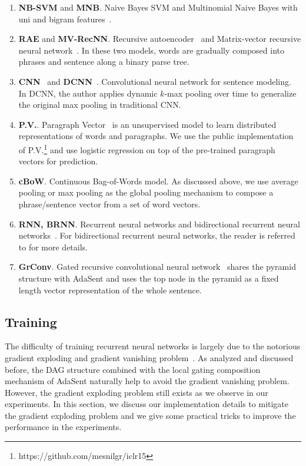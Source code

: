 \documentclass{article}
\theoremstyle{definition}
\begin{document}
\begin{enumerate}
	\item 	\textbf{NB-SVM} and \textbf{MNB}. Naive Bayes SVM and Multinomial Naive Bayes with uni and bigram features~\cite{wang2012baselines}. 
	\item 	\textbf{RAE} and \textbf{MV-RecNN}. Recursive autoencoder~\cite{socher2011semi} and Matrix-vector recursive neural network~\cite{socher2012semantic}. In these two models, words are gradually composed into phrases and sentence along a binary parse tree.
	\item 	\textbf{CNN}~\cite{kim2014convolutional} and \textbf{DCNN}~\cite{KalchbrennerACL2014}. Convolutional neural network for sentence modeling. In DCNN, the author applies dynamic $k$-max pooling over time to generalize the original max pooling in traditional CNN.
	\item 	\textbf{P.V.}. Paragraph Vector~\cite{le2014distributed} is an unsupervised model to learn distributed representations of words and paragraphs. We use the public implementation of P.V.\footnote{https://github.com/mesnilgr/iclr15} and use logistic regression on top of the pre-trained paragraph vectors for prediction.
	\item	\textbf{cBoW}. Continuous Bag-of-Words model. As discussed above, we use average pooling or max pooling as the global pooling mechanism to compose a phrase/sentence vector from a set of word vectors.
	\item 	\textbf{RNN, BRNN}. Recurrent neural networks and bidirectional recurrent neural networks~\cite{schuster1997bidirectional}. 
For bidirectional recurrent neural networks, the reader is referred to \cite{lai2015recurrent} for more details.
	\item 	\textbf{GrConv}. Gated recursive convolutional neural network~\cite{cho2014properties} shares the pyramid structure with AdaSent and uses the top node in the pyramid as a fixed length vector representation of the whole sentence. 
\end{enumerate}

\subsection{Training}


The difficulty of training recurrent neural networks is largely due to the notorious gradient exploding and gradient vanishing problem~\cite{bengio1994learning,pascanu2013difficulty}. As analyzed and discussed before, the DAG structure combined with the local gating composition mechanism of AdaSent naturally help to avoid the gradient vanishing problem. However, the gradient exploding problem still exists as we observe in our experiments. In this section, we discuss our implementation details to mitigate the gradient exploding problem and we give some practical tricks to improve the performance in the experiments.
\end{document}
